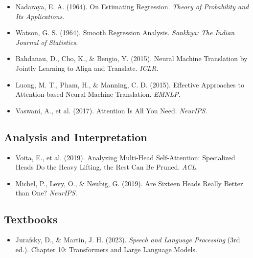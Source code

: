 \documentclass{article}
\begin{document}
\begin{itemize}
    \item Nadaraya, E. A. (1964). On Estimating Regression. \textit{Theory of Probability and Its Applications}.
    \item Watson, G. S. (1964). Smooth Regression Analysis. \textit{Sankhya: The Indian Journal of Statistics}.
    \item Bahdanau, D., Cho, K., \& Bengio, Y. (2015). Neural Machine Translation by Jointly Learning to Align and Translate. \textit{ICLR}.
    \item Luong, M. T., Pham, H., \& Manning, C. D. (2015). Effective Approaches to Attention-based Neural Machine Translation. \textit{EMNLP}.
    \item Vaswani, A., et al. (2017). Attention Is All You Need. \textit{NeurIPS}.
\end{itemize}

\subsection{Analysis and Interpretation}

\begin{itemize}
    \item Voita, E., et al. (2019). Analyzing Multi-Head Self-Attention: Specialized Heads Do the Heavy Lifting, the Rest Can Be Pruned. \textit{ACL}.
    \item Michel, P., Levy, O., \& Neubig, G. (2019). Are Sixteen Heads Really Better than One? \textit{NeurIPS}.
\end{itemize}

\subsection{Textbooks}

\begin{itemize}
    \item Jurafsky, D., \& Martin, J. H. (2023). \textit{Speech and Language Processing} (3rd ed.). Chapter 10: Transformers and Large Language Models.
\end{itemize}
\end{document}
